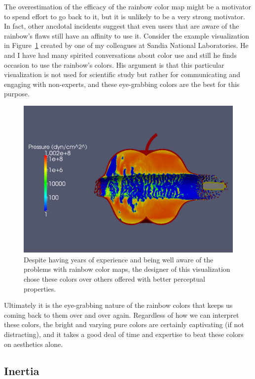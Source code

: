 \documentclass[letterpaper,twocolumn,fleqn]{article}
\begin{document}
The overestimation of the efficacy of the rainbow color map might be a
motivator to spend effort to go back to it, but it is unlikely to be a very
strong motivator. In fact, other ancdotal incidents suggest that even users
that are aware of the rainbow's flaws still have an affinity to use it.
Consider the example visualization in Figure~\ref{fig:ExpertRainbowVis}
created by one of my colleagues at Sandia National Laboratories. He and I
have had many spirited conversations about color use and still he finds
occasion to use the rainbow's colors. His argument is that this particular
visualization is not used for scientific study but rather for communicating
and engaging with non-experts, and these eye-grabbing colors are the best
for this purpose.

\begin{figure}[htb]
  \centering
  \includegraphics[width=\linewidth]{images/pres-log-legend-0042}
  \caption{Despite having years of experience and being well aware of the
    problems with rainbow color maps, the designer of this visualization
    chose these colors over others offered with better perceptual
    properties.}
  \label{fig:ExpertRainbowVis}
\end{figure}

Ultimately it is the eye-grabbing nature of the rainbow colors that keeps
us coming back to them over and over again. Regardless of how we can
interpret these colors, the bright and varying pure colors are certainly
captivating (if not distracting), and it takes a good deal of time and
expertise to beat these colors on aesthetics alone.

\subsection{Inertia}
\end{document}
